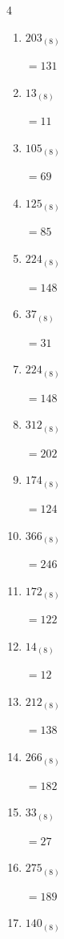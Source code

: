 \begin{multicols}{4}
\begin{enumerate}
  \item $203_{(8)}$

        $=131$

  \item $13_{(8)}$

        $=11$

  \item $105_{(8)}$

        $=69$

  \item $125_{(8)}$

        $=85$

  \item $224_{(8)}$

        $=148$

  \item $37_{(8)}$

        $=31$

  \item $224_{(8)}$

        $=148$

  \item $312_{(8)}$

        $=202$

  \item $174_{(8)}$

        $=124$

  \item $366_{(8)}$

        $=246$

  \item $172_{(8)}$

        $=122$

\columnbreak %

  \item $14_{(8)}$

        $=12$

  \item $212_{(8)}$

        $=138$

  \item $266_{(8)}$

        $=182$

  \item $33_{(8)}$

        $=27$

  \item $275_{(8)}$

        $=189$

  \item $140_{(8)}$


\end{enumerate}
\end{multicols}
